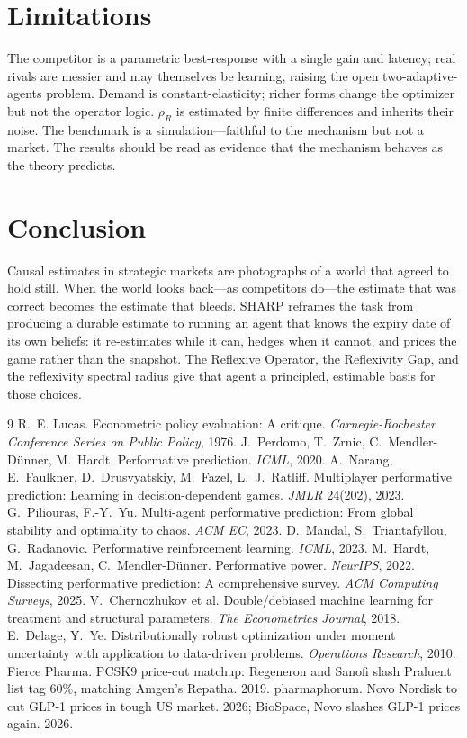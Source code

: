 \documentclass[11pt]{article}
\newcommand{\rhoR}{\rho_{R}}
\begin{document}
\section{Limitations}
The competitor is a parametric best-response with a single gain and latency; real rivals are
messier and may themselves be learning, raising the open two-adaptive-agents problem. Demand is
constant-elasticity; richer forms change the optimizer but not the operator logic. $\rhoR$ is
estimated by finite differences and inherits their noise. The benchmark is a simulation---faithful
to the mechanism but not a market. The results should be read as evidence that the mechanism
behaves as the theory predicts.

\section{Conclusion}
Causal estimates in strategic markets are photographs of a world that agreed to hold still. When
the world looks back---as competitors do---the estimate that was correct becomes the estimate that
bleeds. SHARP reframes the task from producing a durable estimate to running an agent that knows
the expiry date of its own beliefs: it re-estimates while it can, hedges when it cannot, and
prices the game rather than the snapshot. The Reflexive Operator, the Reflexivity Gap, and the
reflexivity spectral radius give that agent a principled, estimable basis for those choices.

\begin{thebibliography}{9}
 R.~E. Lucas. Econometric policy evaluation: A critique.
\emph{Carnegie-Rochester Conference Series on Public Policy}, 1976.
 J.~Perdomo, T.~Zrnic, C.~Mendler-D\"unner, M.~Hardt. Performative
prediction. \emph{ICML}, 2020.
 A.~Narang, E.~Faulkner, D.~Drusvyatskiy, M.~Fazel, L.~J.~Ratliff.
Multiplayer performative prediction: Learning in decision-dependent games. \emph{JMLR}
24(202), 2023.
 G.~Piliouras, F.-Y.~Yu. Multi-agent performative prediction: From global
stability and optimality to chaos. \emph{ACM EC}, 2023.
 D.~Mandal, S.~Triantafyllou, G.~Radanovic. Performative reinforcement
learning. \emph{ICML}, 2023.
 M.~Hardt, M.~Jagadeesan, C.~Mendler-D\"unner. Performative power.
\emph{NeurIPS}, 2022.
 Dissecting performative prediction: A comprehensive survey.
\emph{ACM Computing Surveys}, 2025.
 V.~Chernozhukov et al. Double/debiased machine learning for treatment
and structural parameters. \emph{The Econometrics Journal}, 2018.
 E.~Delage, Y.~Ye. Distributionally robust optimization under moment
uncertainty with application to data-driven problems. \emph{Operations Research}, 2010.
 Fierce Pharma. PCSK9 price-cut matchup: Regeneron and Sanofi slash Praluent list
tag 60\%, matching Amgen's Repatha. 2019.
 pharmaphorum. Novo Nordisk to cut GLP-1 prices in tough US market. 2026;
BioSpace, Novo slashes GLP-1 prices again. 2026.
\end{thebibliography}
\end{document}
